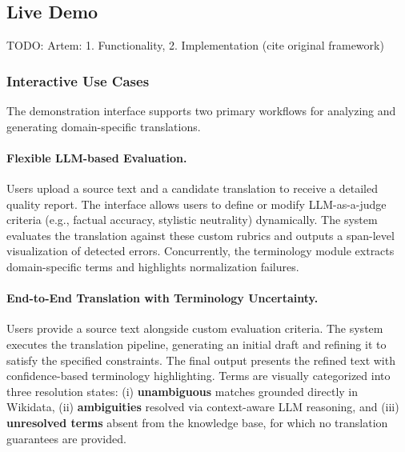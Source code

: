 \documentclass[11pt]{article}
\begin{document}


\subsection{Live Demo} TODO: Artem: 1. Functionality, 2. Implementation (cite original framework)


\subsubsection{Interactive Use Cases}
The demonstration interface supports two primary workflows for analyzing and generating domain-specific translations.

\paragraph{Flexible LLM-based Evaluation.}
Users upload a source text and a candidate translation to receive a detailed quality report. The interface allows users to define or modify LLM-as-a-judge criteria (e.g., factual accuracy, stylistic neutrality) dynamically. The system evaluates the translation against these custom rubrics and outputs a span-level visualization of detected errors. Concurrently, the terminology module extracts domain-specific terms and highlights normalization failures.

\paragraph{End-to-End Translation with Terminology Uncertainty.}
Users provide a source text alongside custom evaluation criteria. The system executes the translation pipeline, generating an initial draft and refining it to satisfy the specified constraints. The final output presents the refined text with confidence-based terminology highlighting. Terms are visually categorized into three resolution states: (i) \textbf{unambiguous} matches grounded directly in Wikidata, (ii) \textbf{ambiguities} resolved via context-aware LLM reasoning, and (iii) \textbf{unresolved terms} absent from the knowledge base, for which no translation guarantees are provided.
\end{document}
